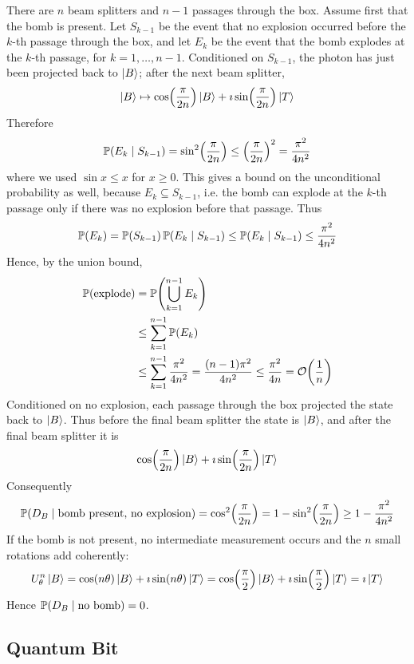 \begin{application}
There are $n$ beam splitters and $n-1$ passages through the box.
Assume first that the bomb is present.  Let $S_{k-1}$ be the event that no
explosion occurred before the $k$-th passage through the box, and let $E_k$ be
the event that the bomb explodes at the $k$-th passage, for
$k=1,\dots,n-1$.
Conditioned on $S_{k-1}$, the photon has just been projected back to $\ket{B}$;
after the next beam splitter,
\[
\ket{B}
\mapsto
\cos\!\left(\frac{\pi}{2n}\right)\ket{B}
+\imath\sin\!\left(\frac{\pi}{2n}\right)\ket{T}
\]
Therefore
\[
\operatorname{\mathbb{P}}(E_k\mid S_{k-1})
=\sin^2\!\left(\frac{\pi}{2n}\right)
\leq \left(\frac{\pi}{2n}\right)^2
=\frac{\pi^2}{4n^2}
\]
where we used $\sin x\leq x$ for $x\geq0$.
This gives a bound on the unconditional probability as well, because
$E_k\subseteq S_{k-1}$, i.e. the bomb can explode at the $k$-th passage only if
there was no explosion before that passage. Thus
\[
\operatorname{\mathbb{P}}(E_k)
=\operatorname{\mathbb{P}}(S_{k-1})\operatorname{\mathbb{P}}(E_k\mid S_{k-1})
\leq \operatorname{\mathbb{P}}(E_k\mid S_{k-1})
\leq \frac{\pi^2}{4n^2}
\]
Hence, by the union bound,
\[
\begin{aligned}
\operatorname{\mathbb{P}}(\text{explode})
&=\operatorname{\mathbb{P}}\!\left(\bigcup_{k=1}^{n-1}E_k\right) \\
&\leq \sum_{k=1}^{n-1}\operatorname{\mathbb{P}}(E_k) \\
&\leq \sum_{k=1}^{n-1}\frac{\pi^2}{4n^2}
=\frac{(n-1)\pi^2}{4n^2}
\leq \frac{\pi^2}{4n}
=\mathcal{O}\!\left(\frac{1}{n}\right)
\end{aligned}
\]
Conditioned on no explosion, each passage through the box projected the state
back to $\ket{B}$. Thus before the final beam splitter the state is $\ket{B}$,
and after the final beam splitter it is
\[
\cos\!\left(\frac{\pi}{2n}\right)\ket{B}
+\imath\sin\!\left(\frac{\pi}{2n}\right)\ket{T}
\]
Consequently
\[
\operatorname{\mathbb{P}}(D_B\mid \text{bomb present, no explosion})
=\cos^2\!\left(\frac{\pi}{2n}\right)
=1-\sin^2\!\left(\frac{\pi}{2n}\right)
\geq 1-\frac{\pi^2}{4n^2}
\]
If the bomb is not present, no intermediate measurement occurs and the $n$
small rotations add coherently:
\[
U_\theta^n\ket{B}
=\cos(n\theta)\ket{B}+\imath\sin(n\theta)\ket{T}
=\cos\!\left(\frac{\pi}{2}\right)\ket{B}
  +\imath\sin\!\left(\frac{\pi}{2}\right)\ket{T}
=\imath\ket{T}
\]
Hence
\(
\operatorname{\mathbb{P}}(D_B\mid \text{no bomb})=0
\).
\end{application}




\subsection{Quantum Bit}\label{sec:quantum-bit}

